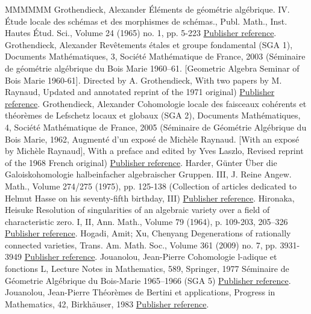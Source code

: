 \documentclass[11pt]{article}
\theoremstyle{definition}
\numberwithin{equation}{section}
\numberwithin{figure}{section}
\numberwithin{table}{section}
\begin{document}
\begin{thebibliography}{MMMMMM}
 Grothendieck, Alexander Éléments de géométrie algébrique. IV. Étude locale des schémas et des morphismes de schémas., Publ. Math., Inst. Hautes Étud. Sci., Volume 24 (1965) no. 1, pp. 5-223 \href{https://ahl.centre-mersenne.org/item/AHL_2020__3__1399_0/#EGA4}{Publisher reference}.
 Grothendieck, Alexander Revêtements étales et groupe fondamental (SGA 1), Documents Mathématiques, 3, Société Mathématique de France, 2003 (Séminaire de géométrie algébrique du Bois Marie 1960–61. [Geometric Algebra Seminar of Bois Marie 1960-61]. Directed by A. Grothendieck, With two papers by M. Raynaud, Updated and annotated reprint of the 1971 original) \href{https://ahl.centre-mersenne.org/item/AHL_2020__3__1399_0/#SGA1}{Publisher reference}.
 Grothendieck, Alexander Cohomologie locale des faisceaux cohérents et théorèmes de Lefschetz locaux et globaux (SGA 2), Documents Mathématiques, 4, Société Mathématique de France, 2005 (Séminaire de Géométrie Algébrique du Bois Marie, 1962, Augmenté d’un exposé de Michèle Raynaud. [With an exposé by Michèle Raynaud], With a preface and edited by Yves Laszlo, Revised reprint of the 1968 French original) \href{https://ahl.centre-mersenne.org/item/AHL_2020__3__1399_0/#SGA2N}{Publisher reference}.
 Harder, Günter Über die Galoiskohomologie halbeinfacher algebraischer Gruppen. III, J. Reine Angew. Math., Volume 274/275 (1975), pp. 125-138 (Collection of articles dedicated to Helmut Hasse on his seventy-fifth birthday, III) \href{https://ahl.centre-mersenne.org/item/AHL_2020__3__1399_0/#Harder}{Publisher reference}.
 Hironaka, Heisuke Resolution of singularities of an algebraic variety over a field of characteristic zero. I, II, Ann. Math., Volume 79 (1964), p. 109-203, 205–326 \href{https://ahl.centre-mersenne.org/item/AHL_2020__3__1399_0/#Hir}{Publisher reference}.
 Hogadi, Amit; Xu, Chenyang Degenerations of rationally connected varieties, Trans. Am. Math. Soc., Volume 361 (2009) no. 7, pp. 3931-3949 \href{https://ahl.centre-mersenne.org/item/AHL_2020__3__1399_0/#HogadiXu}{Publisher reference}.
 Jouanolou, Jean-Pierre Cohomologie l-adique et fonctions L, Lecture Notes in Mathematics, 589, Springer, 1977 Séminaire de Géometrie Algébrique du Bois-Marie 1965–1966 (SGA 5) \href{https://ahl.centre-mersenne.org/item/AHL_2020__3__1399_0/#SGA5}{Publisher reference}.
 Jouanolou, Jean-Pierre Théorèmes de Bertini et applications, Progress in Mathematics, 42, Birkhäuser, 1983 \href{https://ahl.centre-mersenne.org/item/AHL_2020__3__1399_0/#Jou}{Publisher reference}.

\end{thebibliography}
\end{document}
